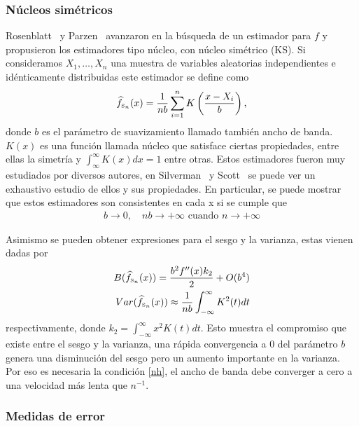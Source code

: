 \subsubsection{Núcleos simétricos}
Rosenblatt~\cite{Rosenblatt56}  y Parzen~\cite{Parzen62} avanzaron en la búsqueda de un estimador para $f$ y propusieron los estimadores tipo núcleo, con núcleo simétrico (KS). Si consideramos $X_1,\ldots,X_n$ una muestra de variables aleatorias independientes e idénticamente distribuidas este estimador se define como
\begin{align}
\label{KS}
\widehat{f}_{\text{\tiny{S}}_n}(x)=\frac{1}{n b} \sum_{i=1}^n K \left(\dfrac{x-X_i}{b}\right),
\end{align}
donde $b$ es el parámetro de suavizamiento llamado también ancho de banda. $K(x)$ es una función llamada núcleo que satisface ciertas propiedades, entre ellas la simetría y $\int_{\infty}^{\infty} K(x)dx=1$ entre otras. Estos estimadores fueron muy estudiados por diversos autores, en Silverman~\cite{Silverman1986} y Scott~\cite{Scott1992} se puede ver un exhaustivo estudio de ellos y sus propiedades. En particular, se puede mostrar que estos estimadores son consistentes en cada x si se cumple que  
\begin{align}
\label{nh}
b \to 0,  \quad nb \to +\infty \text{ cuando } n \to +\infty
\end{align}	

Asimismo se pueden obtener expresiones para el sesgo y la varianza, estas vienen dadas por
\begin{align}
\label{SesgoVar}
B(\widehat{f}_{\text{\tiny{S}}_n}(x))=\dfrac{b^2 f''(x) k_2}{2}+O(b^4)\\
Var(\widehat{f}_{\text{\tiny{S}}_n}(x))\approx \dfrac{1}{nb} \int_{-\infty}^{\infty} K^2(t)dt\\
\end{align}	
respectivamente, donde $k_2=\int_{-\infty}^{\infty} x^2 K(t)dt$. Esto muestra el compromiso que existe entre el sesgo y la varianza, una rápida convergencia a $0$ del parámetro $b$ genera una disminución del sesgo pero un aumento importante en la varianza. Por eso es necesaria la condición \eqref{nh}, el ancho de banda debe converger a cero a una velocidad más lenta que $n^{-1}.$ 

\subsubsection{Medidas de error}

